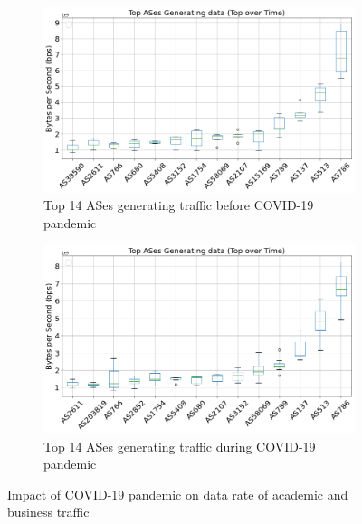 \documentclass[10pt, journal, letterpaper]{IEEEtran}
\newcommand\linearFigSze{0.48}
\begin{document}
\begin{figure}
    \begin{subfigure}{\linearFigSze\textwidth}
          \centering
          \includegraphics[width=\columnwidth]{img/BCO2_top14AS_generating_bps.png}
          \caption{Top 14 ASes generating traffic before COVID-19 pandemic}
          \label{fig:BCO2_topAS_gen_bps}
    \end{subfigure}
    \begin{subfigure}{\linearFigSze\textwidth}
          \centering
          \includegraphics[width=\columnwidth]{img/CO2_top14AS_generating_bps.png}
          \caption{Top 14 ASes generating traffic during COVID-19 pandemic}
          \label{fig:CO2_topAS_gen_bps}
    \end{subfigure}
    \caption{Impact of COVID-19 pandemic on data rate of academic and business traffic}
    \label{fig:topAS_gen_BCO_CO}
\end{figure}
\end{document}
